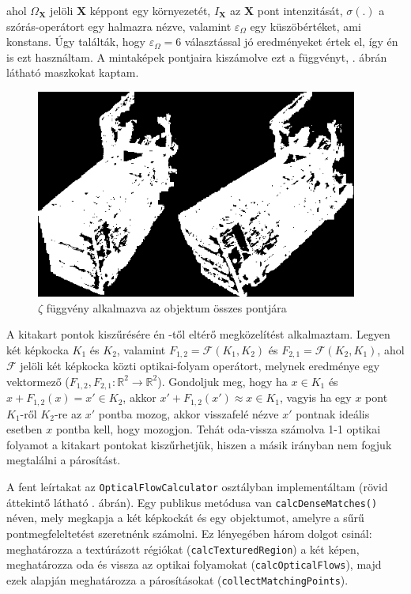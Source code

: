 ahol $\Omega_\mathbf{X}$ jelöli $\mathbf{X}$ képpont egy környezetét, $I_\mathbf{X}$ az $\mathbf{X}$ pont intenzitását, $\sigma(.)$ a szórás-operátort egy halmazra nézve, valamint $\varepsilon_\Omega$ egy küszöbértéket, ami konstans. Úgy találták, hogy $\varepsilon_\Omega = 6$ választással jó eredményeket értek el, így én is ezt használtam. A mintaképek pontjaira kiszámolve ezt a függvényt, . ábrán látható maszkokat kaptam.

\begin{figure}[tbh]
\centering
\includegraphics[width=300pt]{figures/textures.png}
\caption{$\zeta$ függvény alkalmazva az objektum összes pontjára \label{fig:textures}}
\end{figure}

{\color{red}A kitakart pontok kiszűrésére én \cite{optical-flow-rectification}-től eltérő megközelítést alkalmaztam.} Legyen két képkocka $K_1$ és $K_2$, valamint $F_{1, 2} = \mathcal{F}(K_1, K_2)$ és $F_{2, 1} = \mathcal{F}(K_2, K_1)$, ahol $\mathcal{F}$ jelöli két képkocka közti optikai-folyam operátort, melynek eredménye egy vektormező ($F_{1, 2}, F_{2, 1} : \mathbb{R}^2 \rightarrow \mathbb{R}^2$). Gondoljuk meg, hogy ha $x\in K_1$ és $x + F_{1,2}(x) = x' \in K_2$, akkor $x' + F_{1,2}(x') \approx x \in K_1$, vagyis ha egy $x$ pont $K_1$-ről $K_2$-re az $x'$ pontba mozog, akkor visszafelé nézve $x'$ pontnak ideális esetben $x$ pontba kell, hogy mozogjon. Tehát oda-vissza számolva 1-1 optikai folyamot a kitakart pontokat kiszűrhetjük, hiszen a másik irányban nem fogjuk megtalálni a párosítást.

A fent leírtakat az \texttt{OpticalFlowCalculator} osztályban implementáltam (rövid áttekintő látható . ábrán). Egy publikus metódusa van \texttt{calcDenseMatches()} néven, mely megkapja a két képkockát és egy objektumot, amelyre a sűrű pontmegfeleltetést szeretnénk számolni. Ez lényegében három dolgot csinál: meghatározza a textúrázott régiókat (\texttt{calcTexturedRegion}) a két képen, meghatározza oda és vissza az optikai folyamokat (\texttt{calcOpticalFlows}), majd ezek alapján meghatározza a párosításokat (\texttt{collectMatchingPoints}).

